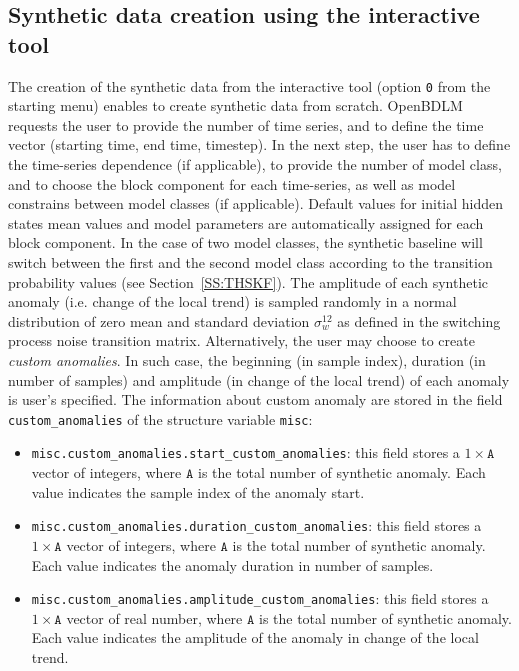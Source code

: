 \subsection{Synthetic data creation using the interactive tool}
The creation of the synthetic data from the interactive tool (option \colorbox{light-gray}{\lstinline[basicstyle = \mlttfamily \small, backgroundcolor = \color{light-gray}]!0!} from the starting menu) enables to create synthetic data from scratch. 
OpenBDLM requests the user to provide the number of time series, and to define the time vector (starting time, end time, timestep).
In the next step, the user has to define the time-series dependence (if applicable), to provide the number of model class, and to choose the block component for each time-series, as well as model constrains between model classes (if applicable).
Default values for initial hidden states mean values and model parameters are automatically assigned for each block component.
In the case of two model classes, the synthetic baseline will switch between the first and the second model class according to the transition probability values (see Section~\ref{SS:THSKF}).
The amplitude of each synthetic anomaly (i.e. change of the local trend) is sampled randomly in a normal distribution of zero mean and standard deviation $\sigma_{w}^{12}$ as defined in the switching process noise transition matrix.
Alternatively, the user may choose to create \emph{custom anomalies}.
In such case, the beginning (in sample index), duration (in number of samples) and amplitude (in change of the local trend) of each anomaly is user's specified.
The information about custom anomaly are stored in the field \lstinline[basicstyle = \mlttfamily \small, backgroundcolor = \color{light-gray}]!custom_anomalies! of the structure variable \lstinline[basicstyle = \mlttfamily \small, backgroundcolor = \color{light-gray}]!misc!:
\begin{itemize}
\item \lstinline[basicstyle = \mlttfamily \small, backgroundcolor = \color{light-gray}]!misc.custom_anomalies.start_custom_anomalies!: this field stores a $1\times \mathtt{A}$ vector of integers, where $\mathtt{A}$ is the total number of synthetic anomaly. Each value indicates the sample index of the anomaly start.
\item \lstinline[basicstyle = \mlttfamily \small, backgroundcolor = \color{light-gray}]!misc.custom_anomalies.duration_custom_anomalies!: this field stores a $1\times \mathtt{A}$ vector of integers, where $\mathtt{A}$ is the total number of synthetic anomaly. Each value indicates the anomaly duration in number of samples.
\item \lstinline[basicstyle = \mlttfamily \small, backgroundcolor = \color{light-gray}]!misc.custom_anomalies.amplitude_custom_anomalies!: this field stores a $1\times \mathtt{A}$ vector of real number, where $\mathtt{A}$ is the total number of synthetic anomaly. Each value indicates the amplitude of the anomaly in change of the local trend.
\end{itemize}

